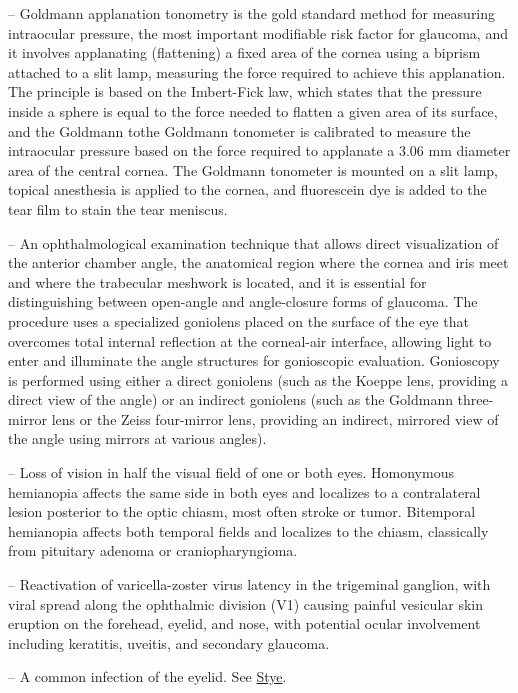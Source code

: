 -- Goldmann applanation tonometry is the gold standard method for measuring intraocular pressure, the most important modifiable risk factor for glaucoma, and it involves applanating (flattening) a fixed area of the cornea using a biprism attached to a slit lamp, measuring the force required to achieve this applanation. The principle is based on the Imbert-Fick law, which states that the pressure inside a sphere is equal to the force needed to flatten a given area of its surface, and the Goldmann tothe Goldmann tonometer is calibrated to measure the intraocular pressure based on the force required to applanate a 3.06 mm diameter area of the central cornea. The Goldmann tonometer is mounted on a slit lamp, topical anesthesia is applied to the cornea, and fluorescein dye is added to the tear film to stain the tear meniscus.

-- An ophthalmological examination technique that allows direct visualization of the anterior chamber angle, the anatomical region where the cornea and iris meet and where the trabecular meshwork is located, and it is essential for distinguishing between open-angle and angle-closure forms of glaucoma. The procedure uses a specialized goniolens placed on the surface of the eye that overcomes total internal reflection at the corneal-air interface, allowing light to enter and illuminate the angle structures for gonioscopic evaluation. Gonioscopy is performed using either a direct goniolens (such as the Koeppe lens, providing a direct view of the angle) or an indirect goniolens (such as the Goldmann three-mirror lens or the Zeiss four-mirror lens, providing an indirect, mirrored view of the angle using mirrors at various angles).

-- Loss of vision in half the visual field of one or both eyes. Homonymous hemianopia affects the same side in both eyes and localizes to a contralateral lesion posterior to the optic chiasm, most often stroke or tumor. Bitemporal hemianopia affects both temporal fields and localizes to the chiasm, classically from pituitary adenoma or craniopharyngioma.

-- Reactivation of varicella-zoster virus latency in the trigeminal ganglion, with viral spread along the ophthalmic division (V1) causing painful vesicular skin eruption on the forehead, eyelid, and nose, with potential ocular involvement including keratitis, uveitis, and secondary glaucoma.

-- A common infection of the eyelid. See \hyperlink{Stye}{Stye}.

